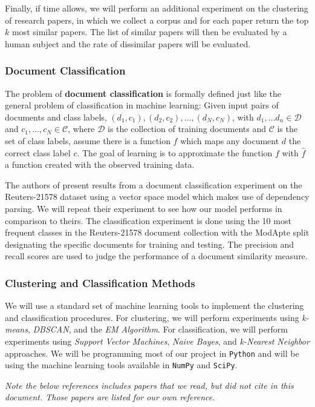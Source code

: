 \documentclass[11pt]{article}
\begin{document}
Finally, if time allows, we will perform an additional experiment on the clustering of research papers, in which we collect a corpus and for each paper return the top $k$ most similar papers. The list of similar papers will then be evaluated by a human subject and the rate of dissimilar papers will be evaluated. 

\subsubsection{Document Classification} \label{sec:DocumentClassification}

The problem of \textbf{document classification} is formally defined just like the general problem of classification in machine learning: Given input pairs of documents and class labels, $(d_1, c_1), (d_2, c_2), \dots, (d_N, c_N)$, with $d_1, \dots d_n \in \mathcal{D}$ and $c_1, \dots, c_N \in \mathcal{C}$, where  $\mathcal{D}$ is the collection of training documents and $\mathcal{C}$ is the set of class labels, assume there is a function $f$ which maps any document $d$ the correct class label $c$. The goal of learning is to approximate the function $f$ with $\hat{f}$ a function created with the observed training data. 

The authors of \cite{Nastase2007} present results from a document classification experiment on the Reuters-21578 dataset using a vector space model which makes use of dependency parsing. We will repeat their experiment to see how our model performs in comparison to theirs. The classification experiment is done using the 10 most frequent classes in the Reuters-21578 document collection with the ModApte split designating the specific documents for training and testing. The precision and recall scores are used to judge the performance of a document similarity measure. 

\subsubsection{Clustering and Classification Methods}

We will use a standard set of machine learning tools to implement the clustering and classification procedures. For clustering, we will perform experiments using \emph{k-means}, \emph{DBSCAN}, and the \emph{EM Algorithm}. For classification, we will perform experiments using \emph{Support Vector Machines}, \emph{Naive Bayes}, and \emph{k-Nearest Neighbor} approaches. We will be programming most of our project in {\tt Python} and will be using the machine learning tools available in {\tt NumPy} and {\tt SciPy}.

\bigskip
\bigskip

\emph{Note the below references includes papers that we read, but did not cite in this document. Those papers are listed for our own reference}.


\nocite{*}



  
  
\end{document}
